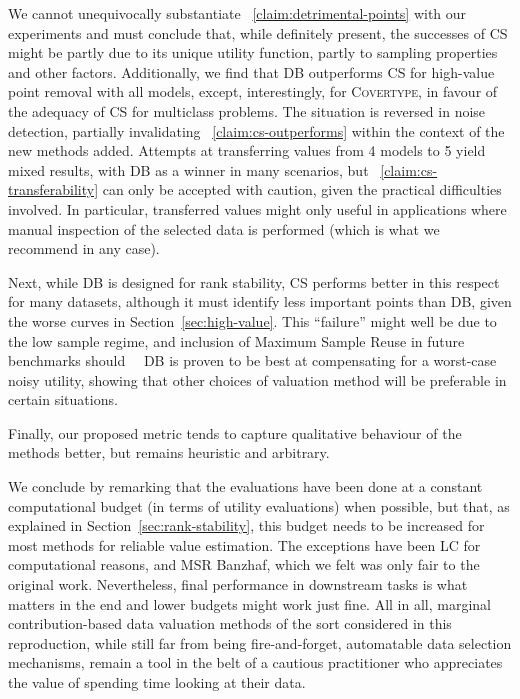 \documentclass[10pt]{article}
\newcommand{\tmname}[1]{\textsc{#1}}
\begin{document}
We cannot unequivocally substantiate ~\ref{claim:detrimental-points} with our
experiments and must conclude that, while definitely present, the successes of
CS might be partly due to its unique utility function, partly to sampling
properties and other factors. Additionally, we find that DB outperforms CS for
high-value point removal with all models, except, interestingly, for
{\tmname{Covertype}}, in favour of the adequacy of CS for multiclass problems.
The situation is reversed in noise detection, partially invalidating
~\ref{claim:cs-outperforms} within the context of the new methods added.
Attempts at transferring values from 4 models to 5 yield mixed results, with
DB as a winner in many scenarios, but ~\ref{claim:cs-transferability} can only
be accepted with caution, given the practical difficulties involved. In
particular, transferred values might only useful in applications where manual
inspection of the selected data is performed (which is what we recommend in
any case).

Next, while DB is designed for rank stability, CS performs better in this
respect for many datasets, although it must identify less important points
than DB, given the worse curves in  Section~\ref{sec:high-value}. This
``failure'' might well be due to the low sample regime, and inclusion of
Maximum Sample Reuse in future benchmarks should \ \ DB is proven to be best
at compensating for a worst-case noisy utility, showing that other choices of
valuation method will be preferable in certain situations.

Finally, our proposed metric  tends to capture qualitative
behaviour of the methods better, but remains heuristic and arbitrary.

We conclude by remarking that the evaluations have been done at a constant
computational budget (in terms of utility evaluations) when possible, but
that, as explained in  Section~\ref{sec:rank-stability}, this budget needs to
be increased for most methods for reliable value estimation. The exceptions
have been LC for computational reasons, and MSR Banzhaf, which we felt was
only fair to the original work. Nevertheless, final performance in downstream
tasks is what matters in the end and lower budgets might work just fine. All
in all, marginal contribution-based data valuation methods of the sort
considered in this reproduction, while still far from being fire-and-forget,
automatable data selection mechanisms, remain a tool in the belt of a cautious
practitioner who appreciates the value of spending time looking at their data.
\end{document}
